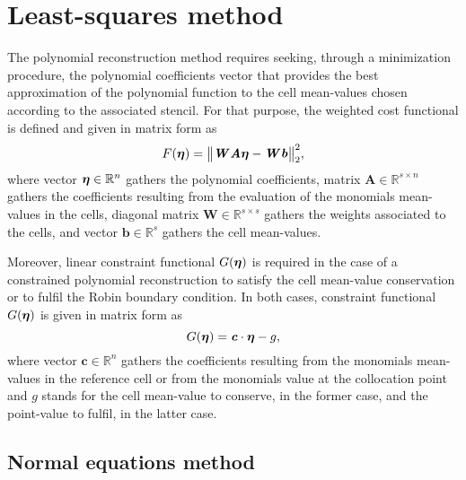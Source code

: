 
\chapter{Least-squares method}
\label{chap:appendix_least_squares_method}

The polynomial reconstruction method requires seeking, through a minimization procedure, the polynomial coefficients vector that provides the best approximation of the polynomial function to the cell mean-values chosen according to the associated stencil.
For that purpose, the weighted cost functional is defined and given in matrix form as
\begin{equation}
\label{eq:appendix_least_squares_method_cost_functional}
F\left(\bs{\eta}\right)=\bigl\Vert\bm{W}\bm{A}\bs{\eta}-\bm{W}\bm{b}\bigr\Vert_{2}^{2},
\end{equation}
where vector $\boldsymbol{\eta}\in\mathbb{R}^{n}$ gathers the polynomial coefficients, matrix $\bm{A}\in\mathbb{R}^{s\times n}$ gathers the coefficients resulting from the evaluation of the monomials mean-values in the cells, diagonal matrix $\bm{W}\in\mathbb{R}^{s\times s}$ gathers the weights associated to the cells, and vector $\bm{b}\in\mathbb{R}^{s}$ gathers the cell mean-values.

Moreover, linear constraint functional $G\left(\bs{\eta}\right)$ is required in the case of a constrained polynomial reconstruction to satisfy the cell mean-value conservation or to fulfil the Robin boundary condition.
In both cases, constraint functional $G\left(\bs{\eta}\right)$ is given in matrix form as
\begin{equation}
\label{eq:appendix_least_squares_method_constraint_functional}
G\left(\bs{\eta}\right)=\bm{c}\cdot\bs{\eta}-g,
\end{equation}
where vector $\bm{c}\in\mathbb{R}^{n}$ gathers the coefficients resulting from the monomials mean-values in the reference cell or from the monomials value at the collocation point and $g$ stands for the cell mean-value to conserve, in the former case, and the point-value to fulfil, in the latter case.

\section{Normal equations method}
\label{sec:appendix_least_squares_method_normal_equations_method}

